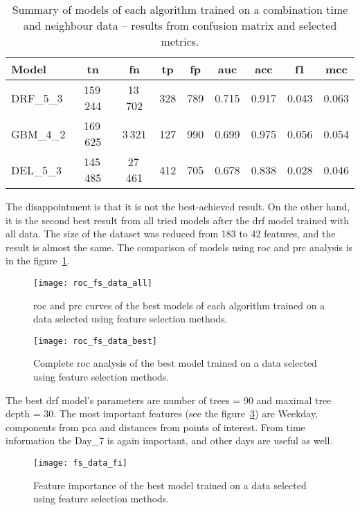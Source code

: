 \documentclass[thesis=M,english]{FITthesis}[2012/10/20]
\begin{document}
\begin{table}[ht]\centering
\begin{small}
    \caption{Summary of models of each algorithm trained on a combination time and neighbour data -- results from confusion matrix and selected metrics.}\label{tab:fs_data_summary}
    \begin{tabular}{|l|c|c|c|c|c|c|c|c|}\hline
        Model & \gls{tn} & \gls{fn} & \gls{tp} & \gls{fp} & \gls{auc} & \gls{acc} & \gls{f1} & \gls{mcc} \tabularnewline \hline \hline
        DRF\_5\_3 & 159\,244 & 13\,702 & 328 & 789 & 0.715 & 0.917 & 0.043 & 0.063 \tabularnewline \hline
        GBM\_4\_2 & 169\,625 & 3\,321 & 127 & 990 & 0.699 & 0.975 & 0.056 & 0.054 \tabularnewline \hline
        DEL\_5\_3 & 145\,485 & 27\,461 & 412 & 705 & 0.678 & 0.838 & 0.028 & 0.046 \tabularnewline \hline
    \end{tabular}
\end{small}
\end{table}

The disappointment is that it is not the best-achieved result. On the other hand, it is the second best result from all tried models after the \gls{drf} model trained with all data. The size of the dataset was reduced from 183 to 42 features, and the result is almost the same. The comparison of models using \gls{roc} and \gls{prc} analysis is in the figure~\ref{fig:roc_fs_data_all}.

\begin{figure}[ht]\centering
    \texttt{[image: roc\_fs\_data\_all]}\label{fig:roc_fs_data_all}
    \caption{\gls{roc} and \gls{prc} curves of the best models of each algorithm trained on a data selected using feature selection methods.}
\end{figure}

\begin{figure}[ht]\centering
    \texttt{[image: roc\_fs\_data\_best]}\label{fig:roc_fs_data_best}
    \caption{Complete \gls{roc} analysis of the best model trained on a data selected using feature selection methods.}
\end{figure}

The best \gls{drf} model's parameters are number of trees = 90 and maximal tree depth = 30. The most important features (see the figure~\ref{fig:fs_data_fi}) are Weekday, components from \gls{pca} and distances from points of interest. From time information the Day\_7 is again important, and other days are useful as well.  

\begin{figure}[ht]\centering
    \texttt{[image: fs\_data\_fi]}\label{fig:fs_data_fi}
    \caption{Feature importance of the best model trained on a data selected using feature selection methods.}
\end{figure}
\end{document}
